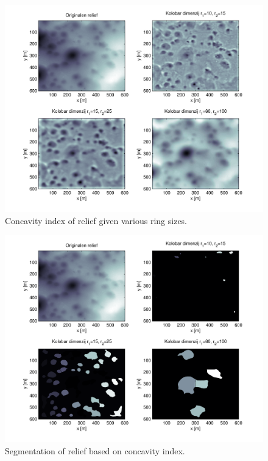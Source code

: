 \documentclass[a0,portrait]{a0poster}
\begin{document}
\begin{multicols}{2}
	\begin{minipage}[b]{0.5\textwidth}
	\centering
      \begin{minipage}{0.46\linewidth}
      \centering
          \begin{figure}[H]
              \includegraphics[width=\textwidth]{concavity-samples.pdf}
              \caption{Concavity index of relief given various ring sizes.}
              \label{fig:concavity-samples}
          \end{figure}
      \end{minipage}
      \hspace{0.05\linewidth}
      \begin{minipage}{0.46\linewidth}
      \centering
          \begin{figure}[H]
              \includegraphics[width=\textwidth]{concavity-segmentation-samples.pdf}
              \caption{Segmentation of relief based on concavity index.}
              \label{fig:concavity-segmentation}
          \end{figure}
      \end{minipage}
	\end{minipage}


\end{multicols}
\end{document}
